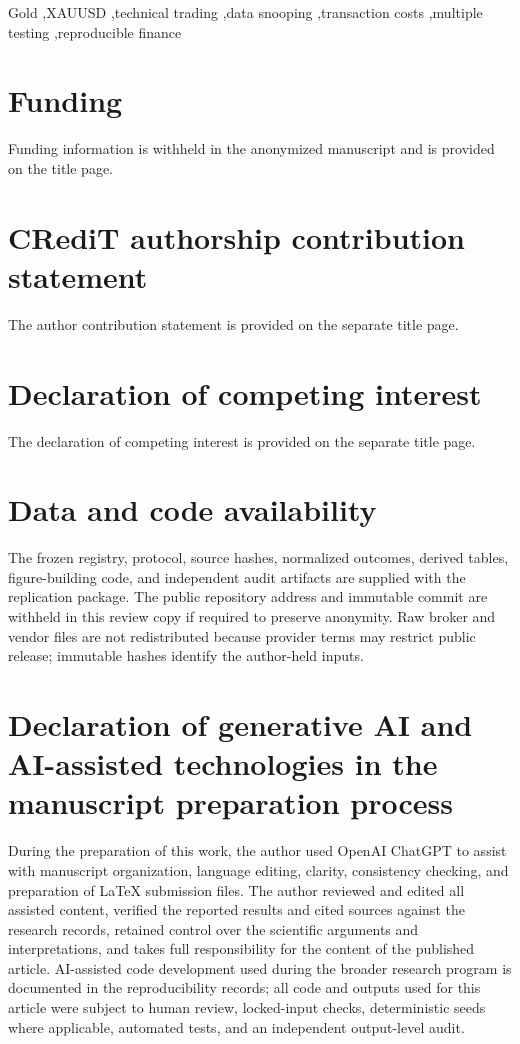 \documentclass[a4paper,fleqn]{cas-sc}
\begin{document}
\begin{keywords}
Gold \sep XAUUSD \sep technical trading \sep data snooping \sep transaction costs \sep multiple testing \sep reproducible finance
\end{keywords}

\maketitle


\section*{Funding}
Funding information is withheld in the anonymized manuscript and is provided on the title page.

\section*{CRediT authorship contribution statement}
The author contribution statement is provided on the separate title page.

\section*{Declaration of competing interest}
The declaration of competing interest is provided on the separate title page.

\section*{Data and code availability}
The frozen registry, protocol, source hashes, normalized outcomes, derived tables, figure-building code, and independent audit artifacts are supplied with the replication package. The public repository address and immutable commit are withheld in this review copy if required to preserve anonymity. Raw broker and vendor files are not redistributed because provider terms may restrict public release; immutable hashes identify the author-held inputs.

\section*{Declaration of generative AI and AI-assisted technologies in the manuscript preparation process}
During the preparation of this work, the author used OpenAI ChatGPT to assist with manuscript organization, language editing, clarity, consistency checking, and preparation of LaTeX submission files. The author reviewed and edited all assisted content, verified the reported results and cited sources against the research records, retained control over the scientific arguments and interpretations, and takes full responsibility for the content of the published article. AI-assisted code development used during the broader research program is documented in the reproducibility records; all code and outputs used for this article were subject to human review, locked-input checks, deterministic seeds where applicable, automated tests, and an independent output-level audit.



\end{document}
